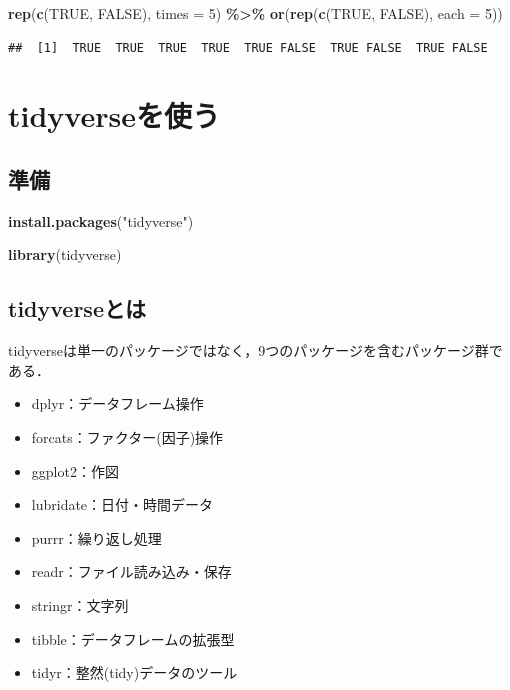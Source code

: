 \documentclass[
]{article}
\newenvironment{Shaded}{\begin{snugshade}}{\end{snugshade}}
\newcommand{\AttributeTok}[1]{\textcolor[rgb]{0.13,0.29,0.53}{#1}}
\newcommand{\ConstantTok}[1]{\textcolor[rgb]{0.56,0.35,0.01}{#1}}
\newcommand{\DecValTok}[1]{\textcolor[rgb]{0.00,0.00,0.81}{#1}}
\newcommand{\FunctionTok}[1]{\textcolor[rgb]{0.13,0.29,0.53}{\textbf{#1}}}
\newcommand{\NormalTok}[1]{#1}
\newcommand{\SpecialCharTok}[1]{\textcolor[rgb]{0.81,0.36,0.00}{\textbf{#1}}}
\newcommand{\StringTok}[1]{\textcolor[rgb]{0.31,0.60,0.02}{#1}}
\providecommand{\tightlist}{%
  \setlength{\itemsep}{0pt}\setlength{\parskip}{0pt}}
\begin{document}
\begin{Shaded}
\begin{Highlighting}[]
\FunctionTok{rep}\NormalTok{(}\FunctionTok{c}\NormalTok{(}\ConstantTok{TRUE}\NormalTok{, }\ConstantTok{FALSE}\NormalTok{), }\AttributeTok{times =} \DecValTok{5}\NormalTok{) }\SpecialCharTok{\%\textgreater{}\%}
  \FunctionTok{or}\NormalTok{(}\FunctionTok{rep}\NormalTok{(}\FunctionTok{c}\NormalTok{(}\ConstantTok{TRUE}\NormalTok{, }\ConstantTok{FALSE}\NormalTok{), }\AttributeTok{each =} \DecValTok{5}\NormalTok{))}
\end{Highlighting}
\end{Shaded}

\begin{verbatim}
##  [1]  TRUE  TRUE  TRUE  TRUE  TRUE FALSE  TRUE FALSE  TRUE FALSE
\end{verbatim}

\hypertarget{tidyverse}{%
\section{tidyverseを使う}\label{tidyverse}}

\hypertarget{ux6e96ux5099-1}{%
\subsection{準備}\label{ux6e96ux5099-1}}

\begin{Shaded}
\begin{Highlighting}[]
\FunctionTok{install.packages}\NormalTok{(}\StringTok{"tidyverse"}\NormalTok{)}
\end{Highlighting}
\end{Shaded}

\begin{Shaded}
\begin{Highlighting}[]
\FunctionTok{library}\NormalTok{(tidyverse)}
\end{Highlighting}
\end{Shaded}

\hypertarget{tidyverseux3068ux306f}{%
\subsection{tidyverseとは}\label{tidyverseux3068ux306f}}

tidyverseは単一のパッケージではなく，9つのパッケージを含むパッケージ群である．

\begin{itemize}
\tightlist
\item
  dplyr：データフレーム操作
\item
  forcats：ファクター(因子)操作
\item
  ggplot2：作図
\item
  lubridate：日付・時間データ
\item
  purrr：繰り返し処理
\item
  readr：ファイル読み込み・保存
\item
  stringr：文字列
\item
  tibble：データフレームの拡張型
\item
  tidyr：整然(tidy)データのツール
\end{itemize}
\end{document}
